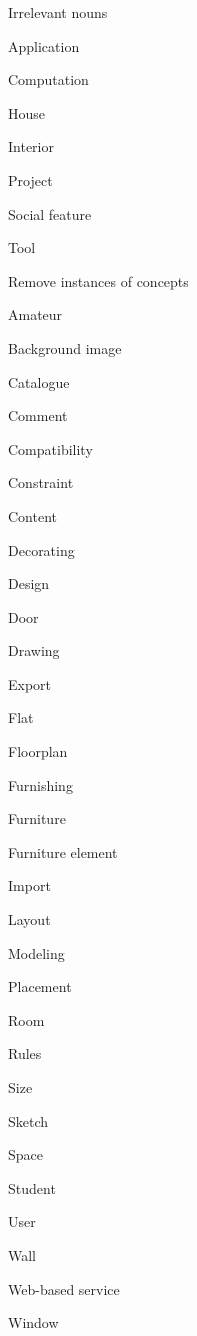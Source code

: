 \begin{paracol}{4}
			
			\bigskip
			
			Irrelevant nouns
			\begin{compactitem}
				\item Application
				\item Computation
				\item House
				\item Interior
				\item Project
				\item Social feature
				\item Tool
			\end{compactitem}
			\switchcolumn
			
			
			Remove instances of concepts\\
			\begin{compactitem}
				\item Amateur
				\item Background image
				\item Catalogue
				\item Comment
				\item Compatibility
				\item Constraint
				\item Content
				\item Decorating
				\item Design
				\item Door
				\item Drawing
				\item Export
				\item Flat
				\item Floorplan
				\item Furnishing
				\item Furniture
				\item Furniture element
				\item Import
				\item Layout
				\item Modeling
				\item Placement
				\item Room
				\item Rules
				\item Size
				\item Sketch
				\item Space
				\item Student
				\item User
				\item Wall
				\item Web-based service
				\item Window
			\end{compactitem}
			

\end{paracol}
